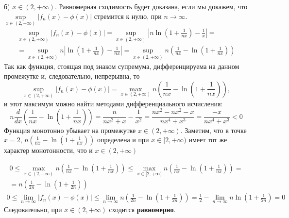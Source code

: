 \documentclass[a5paper, 10pt]{article}
\theoremstyle{definition}
\theoremstyle{plain}
\theoremstyle{remark}
\begin{document}
б)  $x \in (2, + \infty)$. Равномерная сходимость будет доказана, если мы докажем, что $\sup \limits_{x \in (2, + \infty)} \left| f_n (x) - \phi(x)  \right| $ стремится к нулю, при $n \to \infty$.
\begin{multline}
\sup \limits_{x \in (2, + \infty) } \left| f_n (x) - \phi(x)  \right| = \sup \limits_{x \in (2, + \infty) } \left| n \ln \left( 1+ \frac{1}{nx} \right) - \frac{1}{x}  \right| =\\ = \sup \limits_{x \in (2, + \infty) }  n \left| \ln \left( 1+ \frac{1}{nx} \right) - \frac{1}{nx} \right| 
= \sup \limits_{x \in (2, + \infty) }  n \left( \frac{1}{nx}- \ln \left( 1+ \frac{1}{nx} \right)  \right)
\end{multline}
Так как функция, стоящая под знаком супремума, дифференцируема на данном промежутке и, следовательно, непрерывна, то
\begin{equation*}
\sup \limits_{x \in (2, + \infty) } \left| f_n (x) - \phi(x)  \right| = \max \limits_{x \in (2, + \infty) }  n \left( \frac{1}{nx}- \ln \left( 1+ \frac{1}{nx} \right)  \right),
\end{equation*}
и этот максимум можно найти методами дифференциального исчисления:
\begin{equation*}
n \frac{d}{dx} \left(  \frac{1}{nx}- \ln \left( 1+ \frac{1}{nx} \right)  \right) = \frac{n}{nx^2+x}-\frac{1}{x^2} = 
\frac{nx^2-nx^2-x}{nx^4+x^3} = \frac{-x}{nx^4+x^3} < 0
\end{equation*}
Функция монотонно убывает на промежутке  $x \in (2, + \infty)$. Заметим, что в точке $x = 2$,  $n \left( \frac{1}{nx}- \ln \left( 1+ \frac{1}{nx} \right)  \right)$ определена и при $x \in [2, + \infty)$ имеет тот же характер монотонности, что и $x \in (2, + \infty)$

\begin{multline*}
0 \leq \max \limits_{x \in (2, + \infty) }  n \left( \frac{1}{nx}- \ln \left( 1+ \frac{1}{nx} \right)  \right) \leq \max \limits_{x \in [2, + \infty) }  n \left( \frac{1}{nx}- \ln \left( 1+ \frac{1}{nx} \right)  \right) =\\
=  n \left( \frac{1}{2n}- \ln \left( 1+ \frac{1}{2n} \right)  \right)
\end{multline*}
\begin{multline*}
0 \leq \lim_{n \to \infty} \left| f_n (x) - \phi(x)  \right| \leq \lim_{n \to \infty} n \left( \frac{1}{2n}- \ln \left( 1+ \frac{1}{2n} \right)  \right) =
 \frac{1}{2} - \lim_{n \to \infty} n \ln \left( 1+ \frac{1}{2n} \right)  = 0
\end{multline*}
Следовательно, при $x \in (2, + \infty)$ сходится \textbf{равномерно}.\\
\end{document}
